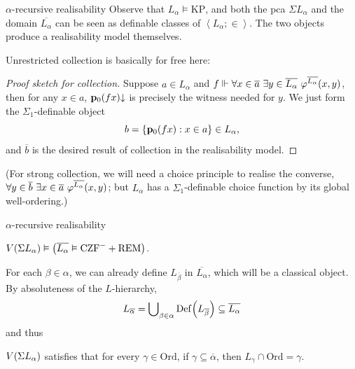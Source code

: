 \documentclass{beamer}
\newcommand\tuple[1]{\left\langle #1 \right\rangle}
\begin{document}
\begin{frame}{$\alpha$-recursive realisability}
  Observe that $L_\alpha \vDash \mathrm{KP}$, and both the pca $\Sigma L_\alpha$ and the domain $\overline{L_\alpha}$ can be seen as definable classes of $\tuple{L_\alpha; \in}$. The two objects produce a realisability model themselves.

  \vspace{0.6em}

  Unrestricted collection is basically for free here:

  \begin{proof}[Proof sketch for collection]
    Suppose $a \in L_\alpha$ and $f \Vdash \forall x \in \overline{a} \ \exists y \in \overline{L_\alpha} \ \varphi^{\overline{L_\alpha}}\mleft(x, y\mright)$, then for any $x \in a$, $\mathbf{p}_0 \mleft(fx\mright) {\downarrow}$ is precisely the witness needed for $y$. We just form the $\Sigma_1$-definable object
    \[b = \left\{\mathbf{p}_0 \mleft(fx\mright) : x \in a\right\} \in L_\alpha,\]
    and $\overline{b}$ is the desired result of collection in the realisability model.
  \end{proof}

  (For strong collection, we will need a choice principle to realise the converse, $\forall y \in \overline{b} \ \exists x \in \overline{a} \ \varphi^{\overline{L_\alpha}}\mleft(x, y\mright)$; but $L_\alpha$ has a $\Sigma_1$-definable choice function by its global well-ordering.)
\end{frame}

\begin{frame}{$\alpha$-recursive realisability}
  \begin{theorem}
    $V\mleft(\Sigma L_\alpha\mright) \vDash \left(\overline{L_\alpha} \vDash \mathrm{CZF}^- + \mathrm{REM}\right)$.
  \end{theorem}

  \vspace{0.6em}

  For each $\beta \in \alpha$, we can already define $L_{\overline{\beta}}$ in $\overline{L_\alpha}$, which will be a classical object. By absoluteness of the $L$-hierarchy,
  \[L_{\overline{\alpha}} = \bigcup\nolimits_{\beta \in \alpha} \mathrm{Def}\mleft(L_{\overline{\beta}}\mright) \subseteq \overline{L_\alpha}\]
  and thus
  \begin{corollary}
    $V\mleft(\Sigma L_\alpha\mright)$ satisfies that for every $\gamma \in \mathrm{Ord}$, if $\gamma \subseteq \overline{\alpha}$, then $L_\gamma \cap \mathrm{Ord} = \gamma$.
  \end{corollary}
\end{frame}
\end{document}
